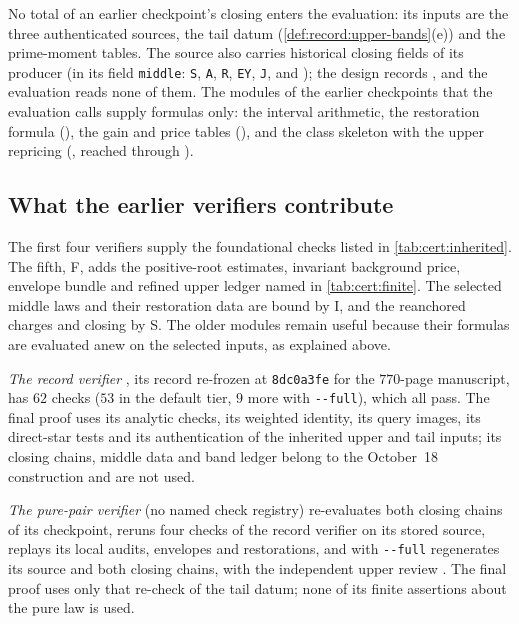 No total of an earlier checkpoint's closing enters the evaluation: its inputs
are the three authenticated sources, the tail datum
(\cref{def:record:upper-bands}(e)) and the prime-moment tables. The source
also carries historical closing fields of its producer (in its field
\texttt{middle}: \texttt{S}, \texttt{A}, \texttt{R}, \texttt{EY}, \texttt{J},
 and ); the design records
, and the evaluation reads
none of them. The modules of the earlier checkpoints that the
evaluation calls supply formulas only: the interval arithmetic, the
restoration formula
(), the gain
and price tables
(),
and the class skeleton with the upper repricing
(, reached through
).\par
\endgroup

\subsection{What the earlier verifiers contribute}\label{subsec:cert:inherited}

The first four verifiers supply the foundational checks listed in
\cref{tab:cert:inherited}. The fifth, F, adds the positive-root estimates,
invariant background price, envelope bundle and refined upper ledger named in
\cref{tab:cert:finite}. The selected middle laws and their restoration data
are bound by I, and the reanchored charges and closing by S.
The older modules remain useful because their formulas are evaluated anew on
the selected inputs, as explained above.

\emph{The record verifier} , its
record re-frozen at \texttt{8dc0a3fe} for the $770$-page manuscript, has $62$
checks ($53$ in the default tier, $9$ more with \texttt{-{}-full}), which all
pass. The final proof uses its analytic checks, its weighted identity, its
query images, its direct-star tests and its authentication of the inherited
upper and tail inputs; its closing chains, middle data and band ledger belong
to the October~18 construction and are not used.

\emph{The pure-pair verifier}  (no
named check registry) re-evaluates both closing chains of its checkpoint,
reruns four checks of the record verifier on its stored source, replays its
local audits, envelopes and restorations, and with \texttt{-{}-full} regenerates
its source and both closing chains, with the independent upper review
. The final proof uses only that re-check of the
tail datum; none of its finite assertions about the pure law is used.

